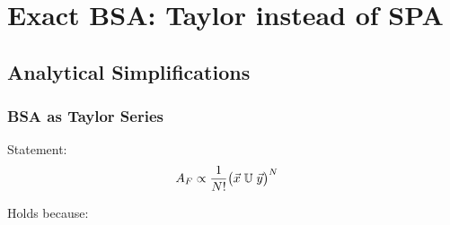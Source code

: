\documentclass[
	english,
	a4paper,
	fontsize=10pt,
	parskip=half,
	titlepage=true,
	DIV=12,
	final
]{scrreprt}
\begin{document}
\chapter{Exact BSA: Taylor instead of SPA}
\section{Analytical Simplifications}
\subsection{BSA as Taylor Series}
Statement:
\begin{align}
	A_F
&\propto
	\frac{1}{N!}
	\qty( \big. \vec{x} \; \mathbb{U} \; \vec{y} )^{N}
\end{align}

Holds because:
\end{document}
